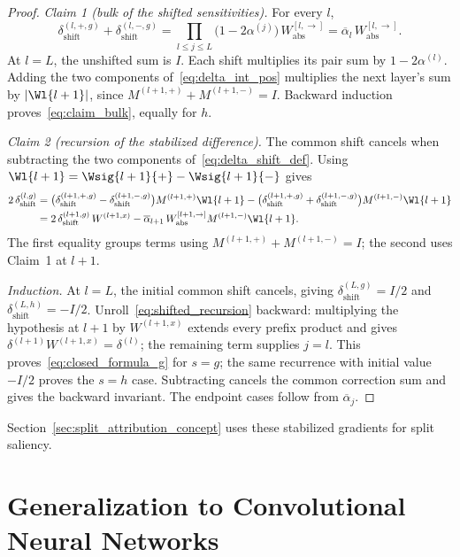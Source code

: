 \begin{proof}
\emph{Claim 1 (bulk of the shifted sensitivities).} For every $l$,
\begin{equation}
	\delta_{\mathrm{shift}}^{(l,+,g)} + \delta_{\mathrm{shift}}^{(l,-,g)} = \prod_{l \le j \le L} \bigl( 1 - 2\alpha^{(j)} \bigr)\, W_{\mathrm{abs}}^{[l, \rightarrow]} = \overline{\alpha}_l\, W_{\mathrm{abs}}^{[l, \rightarrow]}.
	\label{eq:claim_bulk}
\end{equation}
At $l=L$, the unshifted sum is $I$. Each shift multiplies its pair sum by $1-2\alpha^{(l)}$. Adding the two components of~\eqref{eq:delta_int_pos} multiplies the next layer's sum by $|\Wl{l+1}|$, since $M^{(l+1,+)}+M^{(l+1,-)}=I$. Backward induction proves~\eqref{eq:claim_bulk}, equally for $h$.

\emph{Claim 2 (recursion of the stabilized difference).} The common shift cancels when subtracting the two components of~\eqref{eq:delta_shift_def}. Using $\Wl{l+1}=\Wsig{l+1}{+}-\Wsig{l+1}{-}$ gives
\begin{align}
	2\, \delta_{\mathrm{shift}}^{(l,g)}
	&= \bigl( \delta_{\mathrm{shift}}^{(l+1,+,g)} - \delta_{\mathrm{shift}}^{(l+1,-,g)} \bigr) M^{(l+1,+)} \Wl{l+1}
	- \bigl( \delta_{\mathrm{shift}}^{(l+1,+,g)} + \delta_{\mathrm{shift}}^{(l+1,-,g)} \bigr) M^{(l+1,-)} \Wl{l+1} \notag\\
	&= 2\, \delta_{\mathrm{shift}}^{(l+1,g)}\, W^{(l+1,x)} - \overline{\alpha}_{l+1}\, W_{\mathrm{abs}}^{[l+1, \rightarrow]} M^{(l+1,-)} \Wl{l+1}.
	\label{eq:shifted_recursion}
\end{align}
The first equality groups terms using $M^{(l+1,+)} + M^{(l+1,-)} = I$; the second uses Claim~1 at $l+1$.

\emph{Induction.} At $l=L$, the initial common shift cancels, giving $\delta_{\mathrm{shift}}^{(L,g)}=I/2$ and $\delta_{\mathrm{shift}}^{(L,h)}=-I/2$. Unroll~\eqref{eq:shifted_recursion} backward: multiplying the hypothesis at $l+1$ by $W^{(l+1,x)}$ extends every prefix product and gives $\delta^{(l+1)}W^{(l+1,x)}=\delta^{(l)}$; the remaining term supplies $j=l$. This proves~\eqref{eq:closed_formula_g} for $s=g$; the same recurrence with initial value $-I/2$ proves the $s=h$ case. Subtracting cancels the common correction sum and gives the backward invariant. The endpoint cases follow from $\overline{\alpha}_j$.
\end{proof}
Section~\ref{sec:split_attribution_concept} uses these stabilized gradients for split saliency.

\section{Generalization to Convolutional Neural Networks}\label{sec:cnn_decompositions}


